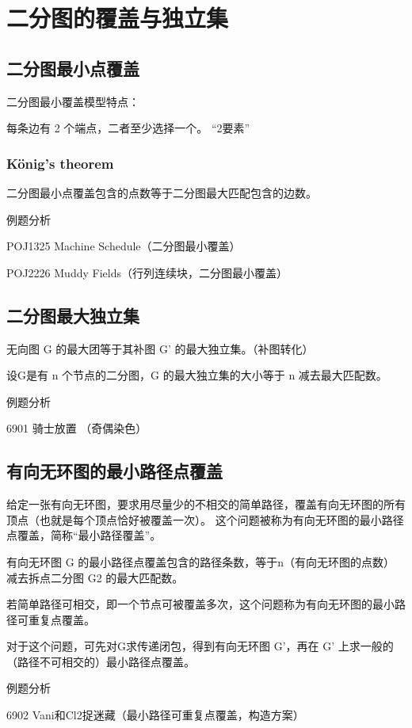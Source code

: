 \section{二分图的覆盖与独立集}
\subsection{二分图最小点覆盖}
二分图最小覆盖模型特点：

每条边有 2 个端点，二者至少选择一个。  “2要素”
\subsubsection{König's theorem}
二分图最小点覆盖包含的点数等于二分图最大匹配包含的边数。

例题分析

POJ1325 Machine Schedule（二分图最小覆盖）

POJ2226 Muddy Fields（行列连续块，二分图最小覆盖）

\subsection{二分图最大独立集}

无向图 G 的最大团等于其补图 G' 的最大独立集。（补图转化）

设G是有 n 个节点的二分图，G 的最大独立集的大小等于 n 减去最大匹配数。

例题分析

6901 骑士放置 （奇偶染色）

\subsection{有向无环图的最小路径点覆盖}
给定一张有向无环图，要求用尽量少的不相交的简单路径，覆盖有向无环图的所有顶点（也就是每个顶点恰好被覆盖一次）。
这个问题被称为有向无环图的最小路径点覆盖，简称“最小路径覆盖”。

有向无环图 G 的最小路径点覆盖包含的路径条数，等于n（有向无环图的点数）减去拆点二分图 G2 的最大匹配数。

若简单路径可相交，即一个节点可被覆盖多次，这个问题称为有向无环图的最小路径可重复点覆盖。

对于这个问题，可先对G求传递闭包，得到有向无环图 G'，再在 G' 上求一般的（路径不可相交的）最小路径点覆盖。

例题分析

6902 Vani和Cl2捉迷藏（最小路径可重复点覆盖，构造方案）
